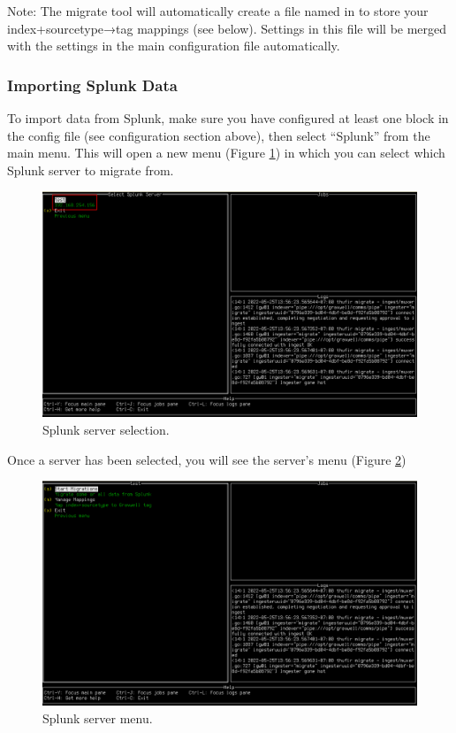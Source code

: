 Note: The migrate tool will automatically create a file named  in  to store your index+sourcetype→tag mappings (see below). Settings in this file will be merged with the settings in the main configuration file automatically.

\subsubsection{Importing Splunk Data}

To import data from Splunk, make sure you have configured at least one  block in the config file (see configuration section above), then select ``Splunk'' from the main menu. This will open a new menu (Figure \ref{fig:splunkserver}) in which you can select which Splunk server to migrate from.

\begin{figure}
	\includegraphics[width=0.95\linewidth]{images/splunkserver.png}
	\caption{Splunk server selection.}
	\label{fig:splunkserver}
\end{figure}

Once a server has been selected, you will see the server's menu (Figure \ref{fig:splunkservermenu})

\begin{figure}
	\includegraphics[width=0.95\linewidth]{images/splunkservermenu.png}
	\caption{Splunk server menu.}
	\label{fig:splunkservermenu}
\end{figure}

